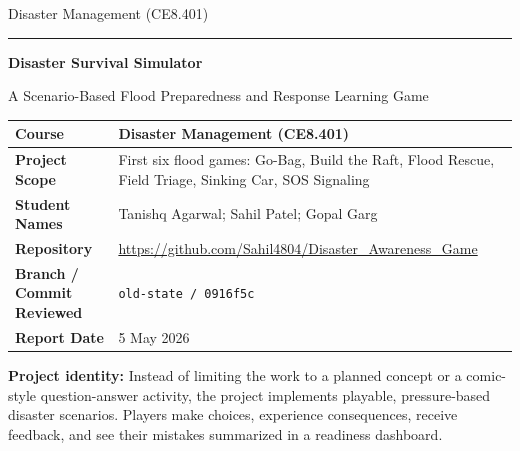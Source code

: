 \documentclass[11pt,a4paper]{article}
\newcommand{\code}[1]{\texttt{#1}}
\begin{document}
\begin{titlepage}
  \centering
  {\large Disaster Management (CE8.401)\par}
  \vspace{1.1cm}
  {\color{ReportBlue}\rule{\textwidth}{2pt}\par}
  \vspace{1.25cm}
  {\Huge\bfseries Disaster Survival Simulator\par}
  \vspace{0.35cm}
  {\Large A Scenario-Based Flood Preparedness and Response Learning Game\par}
  \vspace{0.95cm}

  \begin{tabularx}{\textwidth}{|L{0.27\textwidth}|Y|}
    \hline
    \textbf{Course} & Disaster Management (CE8.401) \\
    \hline
    \textbf{Project Scope} & First six flood games: Go-Bag, Build the Raft, Flood Rescue, Field Triage, Sinking Car, SOS Signaling \\
    \hline
    \textbf{Student Names} & Tanishq Agarwal; Sahil Patel; Gopal Garg \\
    \hline
    \textbf{Repository} & \url{https://github.com/Sahil4804/Disaster_Awareness_Game} \\
    \hline
    \textbf{Branch / Commit Reviewed} & \code{old-state / 0916f5c} \\
    \hline
    \textbf{Report Date} & 5 May 2026 \\
    \hline
  \end{tabularx}

  \vspace{0.9cm}
  \colorbox{ReportLight}{%
    \begin{minipage}{0.94\textwidth}
      \textbf{Project identity:} Instead of limiting the work to a planned concept or a comic-style question-answer activity, the project implements playable, pressure-based disaster scenarios. Players make choices, experience consequences, receive feedback, and see their mistakes summarized in a readiness dashboard.
    \end{minipage}
  }

\end{titlepage}
\end{document}
